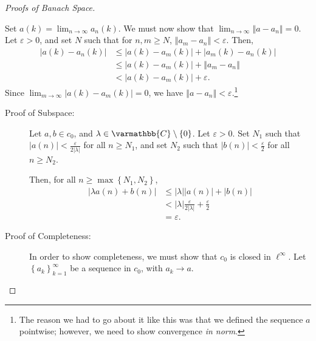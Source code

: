 \documentclass[10pt]{extarticle}
\newcommand{\C}{\mathbb{C}}
\newcommand{\norm}[1]{\left\Vert #1\right\Vert}
\newcommand{\set}[1]{\left\{#1\right\}}
\newcommand{\ve}{\varepsilon}
\theoremstyle{plain}
\theoremstyle{definition}
\theoremstyle{note}
\renewcommand*{\mathbb}[1]{\varmathbb{#1}}
\renewcommand{\newline}{\hfill\break}
\begin{document}
\begin{proof}[Proofs of Banach Space]
\begin{description}[font = \normalfont]
\begin{description}
          Set $a(k) = \lim_{n\rightarrow\infty}a_n(k)$. We must now show that $\lim_{n\rightarrow\infty}\norm{a - a_n} = 0$. Let $\ve > 0$, and set $N$ such that for $n,m\geq N$, $\norm{a_m - a_n} < \ve$. Then,
          \begin{align*}
            \left\vert a(k) - a_n(k) \right\vert &\leq \left\vert a(k) - a_m(k) \right\vert + \left\vert a_m(k) - a_n(k) \right\vert\\
                                                 &\leq \left\vert a(k) - a_m(k) \right\vert + \norm{a_m - a_n}\\
                                                 &< \left\vert a(k) - a_m(k) \right\vert + \ve.
          \end{align*}
          Since $\lim_{m\rightarrow\infty} \left\vert a(k) - a_m(k) \right\vert = 0$, we have $\norm{a - a_n} < \ve$.\footnote{The reason we had to go about it like this was that we defined the sequence $a$ pointwise; however, we need to show convergence \textit{in norm}.}
      \end{description}
    \item[$c_0$:]\hfill
      \begin{description}
        \item[Proof of Subspace:] Let $a,b\in c_0$, and $\lambda \in \C\setminus \set{0}$. Let $\ve > 0$. Set $N_1$ such that $|a(n)| < \frac{\ve}{2|\lambda|}$ for all $n\geq N_1$, and set $N_2$ such that $|b(n)| < \frac{\ve}{2}$ for all $n \geq N_2$.\newline

          Then, for all $n \geq \max\set{N_1,N_2}$,
          \begin{align*}
            |\lambda a(n) + b(n)| &\leq |\lambda||a(n)| + |b(n)|\\
                                  &< |\lambda|\frac{\ve}{2|\lambda|} + \frac{\ve}{2}\\
                                  &= \ve.
          \end{align*}
        \item[Proof of Completeness:] In order to show completeness, we must show that $c_0$ is closed in $\ell^{\infty}$. Let $\set{a_k}_{k=1}^{\infty}$ be a sequence in $c_0$, with $a_k \rightarrow a$.\newline


\end{description}
\end{description}
\end{proof}
\end{document}
